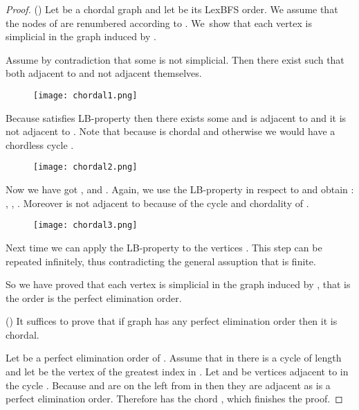 \documentclass[a4paper, 11pt]{article}
\begin{document}
\begin{proof}
    () Let  be a chordal graph and let  be its LexBFS
    order. We assume that the nodes of  are renumbered according to . We~show that each 
    vertex  is simplicial in the graph induced by . 

    Assume by contradiction that some  is not simplicial. Then there exist  
    such that  both adjacent to  and not adjacent themselves.

    \begin{figure}[h]
        \begin{center}
            \texttt{[image: chordal1.png]}
        \end{center}
    \end{figure}

    Because  satisfies LB-property then there exists some   and  
    is adjacent to  and it is not adjacent to . Note that  because  is 
    chordal and otherwise we would have a chordless cycle .

    \begin{figure}[h]
        \begin{center}
            \texttt{[image: chordal2.png]}
        \end{center}
    \end{figure}

    Now we have got ,  and . Again, we use the LB-property 
    in respect to  and obtain : , , . Moreover  
    is not adjacent to  because of the cycle  and chordality of .

    \begin{figure}[h]
        \begin{center}
            \texttt{[image: chordal3.png]}
        \end{center}
    \end{figure}

    Next time we can apply the LB-property to the vertices . This step can be repeated 
    infinitely, thus contradicting the general assuption that  is finite.

    So we have proved that each vertex  is simplicial in the graph induced by , that is the order  is the perfect elimination order.

    () It suffices to prove that if graph  has any perfect elimination order
    then it is chordal.
    
    Let  be a perfect elimination order of . Assume that in  
    there is a cycle  of length  and let  be the vertex of the greatest 
    index in . Let  and  be vertices adjacent to  in the cycle . 
    Because  and  are on the left from  in  then they are adjacent as  
    is a perfect elimination order. Therefore  has the chord , which finishes the proof.

\end{proof}
\end{document}
